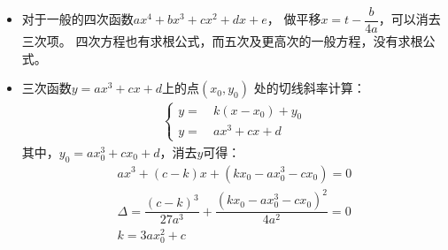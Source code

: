 \begin{itemize}[leftmargin=\inteval{\myitemleftmargin}pt,itemsep=
   \inteval{\myitemitempsep}pt,topsep=\inteval{\myitemtopsep}pt]
\item 对于一般的四次函数$ ax^4+bx^3+cx^2+dx+e $，
做平移$ x=t-\dfrac{b}{4a} $，可以消去三次项。
四次方程也有求根公式，而五次及更高次的一般方程，没有求根公式。

\item 三次函数$ y =ax^3+cx+d $上的点$ (x_0,y_0) $
处的切线斜率计算：
\begin{align*}
\left\{
\begin{aligned}
    y =&\ k(x-x_0)+y_0  \\
    y =&\ ax^3+cx+d
\end{aligned}
\right. 
\end{align*}
其中，$ y_0=ax_0^3+cx_0+d $，消去$ y $可得：
\begin{gather*}
ax^3+(c-k)x+(kx_0-ax_0^3-cx_0)=0 \\
\Delta=\dfrac{(c-k)^3}{27a^3}+\dfrac{(kx_0-ax_0^3-cx_0)^2}{4a^2}=0 \\
k=3ax_0^2+c
\end{gather*}

\end{itemize}

